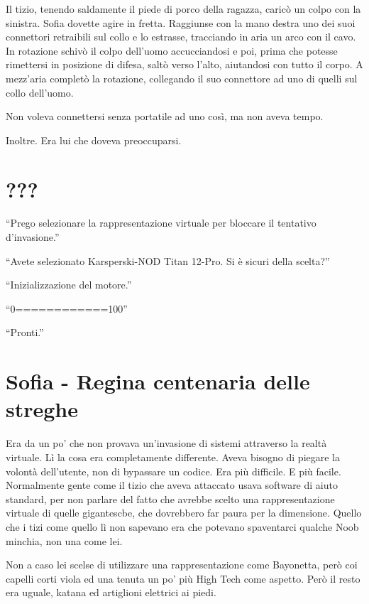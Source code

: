     Il tizio, tenendo saldamente il piede di porco della ragazza, caricò un colpo con la sinistra. Sofia dovette agire
    in fretta. Raggiunse con la mano destra uno dei suoi connettori retraibili sul collo e lo estrasse, tracciando in
    aria un arco con il cavo. In rotazione schivò il colpo dell'uomo accucciandosi e poi, prima che potesse rimettersi
    in posizione di difesa, saltò verso l'alto, aiutandosi con tutto il corpo. A mezz'aria completò la rotazione,
    collegando il suo connettore ad uno di quelli sul collo dell'uomo.

    Non voleva connettersi senza portatile ad uno così, ma non aveva tempo.

    Inoltre. Era lui che doveva preoccuparsi.

  \section*{???}

    ``Prego selezionare la rappresentazione virtuale per bloccare il tentativo d'invasione.''

    ``Avete selezionato Karsperski-NOD Titan 12-Pro. Si è sicuri della scelta?''

    ``Inizializzazione del motore.''

    ``0============100''

    ``Pronti.''

  \section*{Sofia - Regina centenaria delle streghe}

    Era da un po' che non provava un'invasione di sistemi attraverso la realtà virtuale. Lì la cosa era completamente
    differente. Aveva bisogno di piegare la volontà dell'utente, non di bypassare un codice. Era più difficile. E più
    facile. Normalmente gente come il tizio che aveva attaccato usava software di aiuto standard, per non parlare del
    fatto che avrebbe scelto una rappresentazione virtuale di quelle gigantescbe, che dovrebbero far paura per la
    dimensione. Quello che i tizi come quello lì non sapevano era che potevano spaventarci qualche Noob minchia, non una
    come lei.

    Non a caso lei scelse di utilizzare una rappresentazione come Bayonetta, però coi capelli corti viola ed una tenuta
    un po' più High Tech come aspetto. Però il resto era uguale, katana ed artiglioni elettrici ai piedi.

